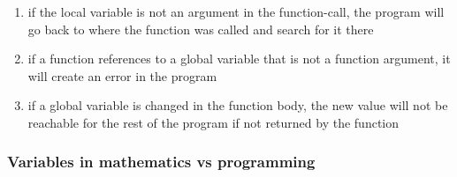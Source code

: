 \begin{enumerate}



    \item if the local variable is not an argument in the function-call, 
the program will go back to where the function was called and search 
for it there

    \item if a function references to a global variable that is not a 
function argument, it will create an error in the program

    \item if a global variable is changed in the function body, the new 
value will not be reachable for the rest of the program if not returned 
by the function
\end{enumerate}


\subsubsection{Variables in mathematics vs programming}

